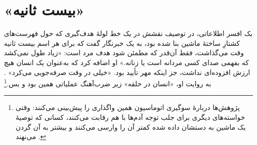 \chapter{«بیست ثانیه»}
\label{sec:1}
یک افسر اطلاعاتی، در توصیف نقشش در یک خط لولهٔ هدف‌گیری که حول فهرست‌های کشتارِ ساختهٔ ماشین بنا شده بود، به یک خبرنگار گفت که برای هر اسم بیست ثانیه وقت می‌گذاشت، فقط آن‌قدر که مطمئن شود هدف مرد است: «زیاد طول نمی‌کشد که بفهمی صدای کسی مردانه است یا زنانه.» او اضافه کرد که به‌عنوان یک انسان هیچ ارزش افزوده‌ای نداشت، جز اینکه مهر تأیید بود. «خیلی در وقت صرفه‌جویی می‌کرد» \autocite{abraham2024lavender}. به روایت او، «انسان در حلقه» زیر ضرب‌آهنگ عملیاتی همین بود و بس.\footnote{پژوهش‌ها دربارهٔ سوگیری اتوماسیون همین واگذاری را پیش‌بینی می‌کنند: وقتی خواسته‌های دیگری برای جلب توجه آدم‌ها با هم رقابت می‌کنند، کسانی که توصیهٔ یک ماشین به دستشان داده شده کمتر آن را وارسی می‌کنند و بیشتر به آن گردن می‌نهند \autocite{parasuraman2010complacency}.}

